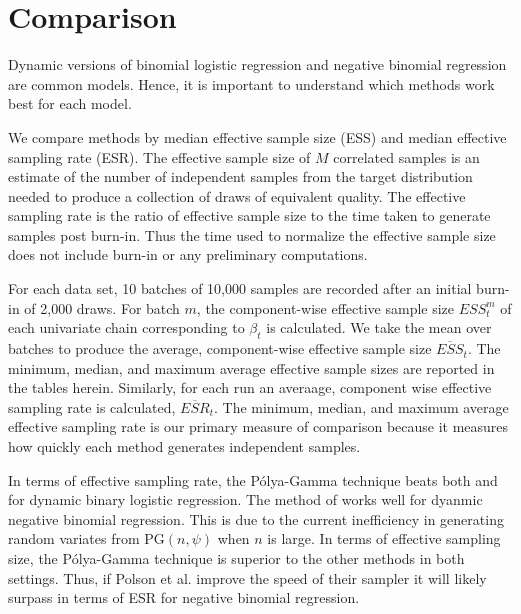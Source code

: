 \documentclass[11pt]{article}
\newcommand{\Polya}{P\'{o}lya}
\newcommand{\PG}{\text{PG}}
\begin{document}

\section{Comparison}

Dynamic versions of binomial logistic regression and negative binomial
regression are common models.  Hence, it is important to understand which
methods work best for each model.

We compare methods by median effective sample size (ESS) and median effective
sampling rate (ESR).  The effective sample size of $M$ correlated samples is an
estimate of the number of independent samples from the target distribution
needed to produce a collection of draws of equivalent quality.  The effective
sampling rate is the ratio of effective sample size to the time taken to
generate samples post burn-in.  Thus the time used to normalize the effective
sample size does not include burn-in or any preliminary computations.

For each data set, 10 batches of 10,000 samples are recorded after an initial
burn-in of 2,000 draws.  For batch $m$, the component-wise effective sample size
$ESS_{t}^{m}$ of each univariate chain corresponding to $\beta_t$ is calculated.
We take the mean over batches to produce the average, component-wise effective
sample size $\overline{ESS}_t$.  The minimum, median, and maximum average
effective sample sizes are reported in the tables herein.  Similarly, for each
run an averaage, component wise effective sampling rate is calculated,
$\overline{ESR}_t$.  The minimum, median, and maximum average effective sampling
rate is our primary measure of comparison because it measures how quickly each
method generates independent samples.

In terms of effective sampling rate, the \Polya-Gamma technique beats both
\cite{ravines-etal-2006} and \cite{fussl-etal-2013} for dynamic binary logistic
regression.  The method of \cite{fruhwirth-schnatter-etal-2009} works well for
dyanmic negative binomial regression.  This is due to the current inefficiency
in generating random variates from $\PG(n, \psi)$ when $n$ is large.  In terms
of effective sampling size, the \Polya-Gamma technique is superior to the other
methods in both settings.  Thus, if Polson et al. improve the speed of their
sampler it will likely surpass \cite{fussl-etal-2013} in terms of ESR for
negative binomial regression.
\end{document}
